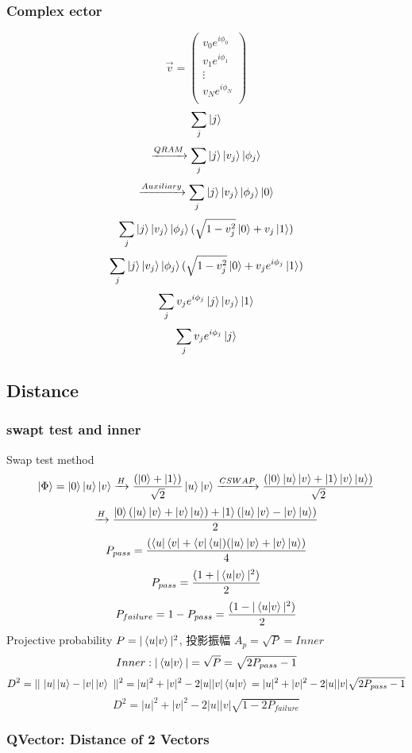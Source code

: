 \documentclass{article}
\begin{document}
\subsubsection{ Complex ector}
$$ \vec{v} =\left(
\begin{array}{c}
v_0 e^{i\phi_0} \\
v_1 e^{i\phi_1} \\
\vdots \\
v_N e^{i\phi_N} \\
\end{array}
\right) $$
$$ \sum_j{ \ket{j} } $$
$$ \xrightarrow{QRAM}  \sum_j{\ket{j}\ket{v_j} \ket{\phi_j} } $$
$$ \xrightarrow{Auxiliary}  \sum_j{\ket{j}\ket{v_j} \ket{\phi_j} \ket{0} } $$
$$  \sum_j{\ket{j}\ket{v_j} \ket{\phi_j} ( \sqrt{1-v_j^2} \ket{0} + v_j\ket{1}) } $$
$$  \sum_j{\ket{j}\ket{v_j} \ket{\phi_j} ( \sqrt{1-v_j^2} \ket{0} + v_j e^{i\phi_j}\ket{1}) } $$
$$  \sum_j{v_j e^{i\phi_j} \ket{j}\ket{v_j}\ket{1} } $$
$$  \sum_j{v_j e^{i\phi_j} \ket{j} } $$



\subsection{Distance}
\subsubsection{swapt test and inner}
Swap test method
$$ \ket{\Phi} = \ket{0} \ket{u} \ket{v} \xrightarrow{H}  \frac{(\ket{0}+\ket{1})}{\sqrt{2} }\ket{u}\ket{v}  \xrightarrow{CSWAP}  \frac{(\ket{0}\ket{u}\ket{v}+\ket{1}	\ket{v}\ket{u})}{\sqrt{2}} \\ $$
$$\xrightarrow{H}  \frac{\ket{0}(\ket{u}\ket{v}+\ket{v}\ket{u})+\ket{1}(\ket{u}\ket{v}-\ket{v}\ket{u})}{2} $$
$$ P_{pass}=\frac{(\bra{u}\bra{v}+\bra{v}\bra{u}) (\ket{u}\ket{v}+\ket{v}\ket{u})}{4}$$
$$ P_{pass}=\frac{(1+|\braket{u|v}|^2)}{2}$$
$$ P_{failure}=1-P_{pass} = \frac{(1-|\braket{u|v}|^2)}{2}$$
 Projective probability $ P = |\braket{u|v}|^2 $, 投影振幅 $A_p = \sqrt{P} = Inner $
$$ Inner: |\braket{u|v}| = \sqrt{P} =\sqrt{ 2P_{pass} -1} $$
$$ D^{2}=||\ |u|\ket{u}-|v|\ket{v}\ ||^{2} = |u|^2+|v|^2-2|u||v| \braket{u|v}\\
 =|u|^2+|v|^2-2|u||v|\sqrt{2P_{pass} - 1} $$
$$ D^2=|u|^2+|v|^2-2|u||v|\sqrt{1-2P_{failure}} $$

\subsubsection{ QVector: Distance of 2 Vectors}
\end{document}
